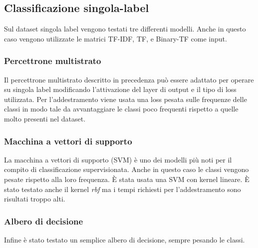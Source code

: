 \documentclass[technote]{IEEEtran}
\begin{document}
\subsection{Classificazione singola-label}
Sul dataset singola label vengono testati tre differenti modelli.
Anche in questo caso vengono utilizzate le matrici TF-IDF, TF, e Binary-TF come input.
\subsubsection{Percettrone multistrato}
Il percettrone multistrato descritto in precedenza può essere
adattato per operare su singola label modificando l'attivazione
del layer di output e il tipo di loss utilizzata.
Per l'addestramento viene usata una loss pesata sulle frequenze
delle classi in modo tale da avvantaggiare le classi poco
frequenti rispetto a quelle molto presenti nel dataset.
\subsubsection{Macchina a vettori di supporto}
La macchina a vettori di supporto (SVM) è uno dei modelli più noti
per il compito di classificazione supervisionata. Anche in questo caso le classi
vengono pesate rispetto alla loro frequenza.
\`E stata usata una SVM con kernel lineare. \`E stato testato anche il
kernel \textit{rbf} ma i tempi richiesti per l'addestramento sono risultati
troppo alti.
\subsubsection{Albero di decisione}
Infine \`e stato testato un semplice albero di decisione, sempre pesando le
classi. 
\end{document}
